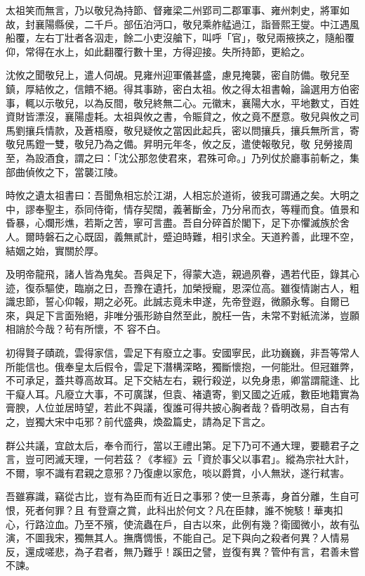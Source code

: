 \begin{pinyinscope}
 太祖笑而無言，乃以敬兒為持節、督雍梁二州郢司二郡軍事、雍州刺史，將軍如故，封襄陽縣侯，二千戶。部伍泊沔口，敬兒乘舴艋過江，詣晉熙王燮。中江遇風船覆，左右丁壯者各泅走，餘二小吏沒艙下，叫呼「官」，敬兒兩掖挾之，隨船覆仰，常得在水上，如此翻覆行數十里，方得迎接。失所持節，更給之。



 沈攸之聞敬兒上，遣人伺覘。見雍州迎軍儀甚盛，慮見掩襲，密自防備。敬兒至鎮，厚結攸之，信饋不絕。得其事跡，密白太祖。攸之得太祖書翰，論選用方伯密事，輒以示敬兒，以為反間，敬兒終無二心。元徽末，襄陽大水，平地數丈，百姓資財皆漂沒，襄陽虛耗。太祖與攸之書，令賑貸之，攸之竟不歷意。敬兒與攸之司馬劉攘兵情款，及蒼梧廢，敬兒疑攸之當因此起兵，密以問攘兵，攘兵無所言，寄敬兒馬鐙一雙，敬兒乃為之備。昇明元年冬，攸之反，遣使報敬兒，敬
 兒勞接周至，為設酒食，謂之曰：「沈公那忽使君來，君殊可命。」乃列仗於廳事前斬之，集部曲偵攸之下，當襲江陵。



 時攸之遺太祖書曰：吾聞魚相忘於江湖，人相忘於道術，彼我可謂通之矣。大明之中，謬奉聖主，忝同侍衛，情存契闊，義著斷金，乃分帛而衣，等糧而食。值景和昏暴，心爛形燋，若斯之苦，寧可言盡。吾自分碎首於閣下，足下亦懼滅族於舍人。爾時磐石之心既固，義無貳計，蹙迫時難，相引求全。天道矜善，此理不空，結姻之始，實關於厚。



 及明帝龍飛，諸人皆為鬼矣。吾與足下，得蒙大造，親過夙眷，遇若代臣，錄其心迹，復忝驅使，臨崩之日，吾豫在遺托，加榮授寵，恩深位高。雖復情謝古人，粗識忠節，誓心仰報，期之必死。此誠志竟未申遂，先帝登遐，微願永奪。自爾已來，與足下言面殆絕，非唯分張形跡自然至此，脫枉一告，未常不對紙流涕，豈願相誚於今哉？茍有所懷，不
 容不白。



 初得賢子賾疏，雲得家信，雲足下有廢立之事。安國寧民，此功巍巍，非吾等常人所能信也。俄奉皇太后假令，雲足下潛構深略，獨斷懷抱，一何能壯。但冠雖弊，不可承足，蓋共尊高故耳。足下交結左右，親行殺逆，以免身患，卿當謂龍逢、比干癡人耳。凡廢立大事，不可廣謀，但袁、褚遺寄，劉又國之近戚，數臣地籍實為膏腴，人位並居時望，若此不與議，復誰可得共披心胸者哉？昏明改易，自古有之，豈獨大宋中屯邪？前代盛典，煥盈篇史，請為足下言之。



 群公共議，宜啟太后，奉令而行，當以王禮出第。足下乃可不通大理，要聽君子之言，豈可罔滅天理，一何若茲？《孝經》云「資於事父以事君」。縱為宗社大計，不爾，寧不識有君親之意邪？乃復慮以家危，啖以爵賞，小人無狀，遂行弒害。



 吾雖寡識，竊從古比，豈有為臣而有近日之事邪？使一旦荼毒，身首分離，生自可恨，死者何罪？且
 有登齋之賞，此科出於何文？凡在臣隸，誰不惋駭！華夷扣心，行路泣血。乃至不殯，使流蟲在戶，自古以來，此例有幾？衛國微小，故有弘演，不圖我宋，獨無其人。撫膺惆悵，不能自己。足下與向之殺者何異？人情易反，還成嗟悲，為子君者，無乃難乎！蹊田之譬，豈復有異？管仲有言，君善未嘗不諫。




\end{pinyinscope}
